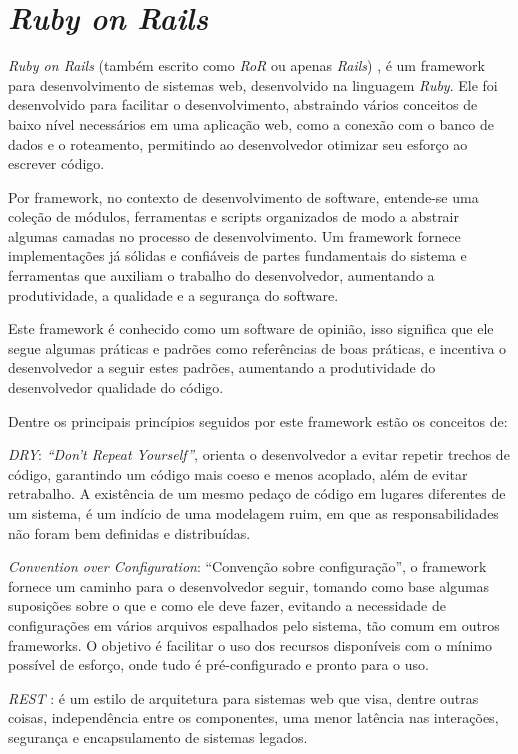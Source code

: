\section{\textit{Ruby on Rails}}

\textit{Ruby on Rails} (também escrito como \textit{RoR} ou apenas \textit{Rails}) \cite{RAILS}, é um framework para desenvolvimento de sistemas web, desenvolvido na linguagem \textit{Ruby}. Ele foi desenvolvido para facilitar o desenvolvimento, abstraindo vários conceitos de baixo nível necessários em uma aplicação web, como a conexão com o banco de dados e o roteamento, permitindo ao desenvolvedor otimizar seu esforço ao escrever código.

Por framework, no contexto de desenvolvimento de software, entende-se uma coleção de módulos, ferramentas e scripts organizados de modo a abstrair algumas camadas no processo de desenvolvimento. Um framework fornece implementações já sólidas e confiáveis de partes fundamentais do sistema e ferramentas que auxiliam o trabalho do desenvolvedor, aumentando a produtividade, a qualidade e a segurança do software.

Este framework é conhecido como um software de opinião, isso significa que ele segue algumas práticas e padrões como referências de boas práticas, e incentiva o desenvolvedor a seguir estes padrões, aumentando a produtividade do desenvolvedor qualidade do código.

Dentre os principais princípios \cite{HANSSON} seguidos por este framework estão os conceitos de:

\textit{DRY}: \textit{“Don’t Repeat Yourself”}, orienta o desenvolvedor a evitar repetir trechos de código, garantindo um código mais coeso e menos acoplado, além de evitar retrabalho. A existência de um mesmo pedaço de código em lugares diferentes de um sistema, é um indício de uma modelagem ruim, em que as responsabilidades não foram bem definidas e distribuídas.

\textit{Convention over Configuration}: “Convenção sobre configuração”, o framework fornece um caminho para o desenvolvedor seguir, tomando como base algumas suposições sobre o que e como ele deve fazer, evitando a necessidade de configurações em vários arquivos espalhados pelo sistema, tão comum em outros frameworks. O objetivo é facilitar o uso dos recursos disponíveis com o mínimo possível de esforço, onde tudo é pré-configurado e pronto para o uso.

\textit{REST} \cite{FIELDING}: é um estilo de arquitetura para sistemas web que visa, dentre outras coisas, independência entre os componentes, uma menor latência nas interações, segurança e encapsulamento de sistemas legados.

